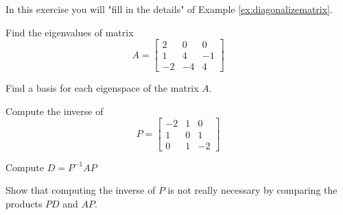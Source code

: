 \documentclass{ximera}
\author{Zack Reed}
\begin{document}
  \begin{problem}
  In this exercise you will "fill in the details" of Example \ref{ex:diagonalizematrix}.
  \begin{problem}\label{prob:ex:diagonalizematrix1}
  Find the eigenvalues of matrix
  \begin{equation*}
  A=\begin{bmatrix}
  2 & 0 & 0 \\
  1 & 4 & -1 \\
  -2 & -4 & 4
  \end{bmatrix}
  \end{equation*}
  \end{problem}
  \begin{problem}\label{prob:ex:diagonalizematrix2}
  Find a basis for each eigenspace of the matrix $A$.
  \end{problem}
  \begin{problem}\label{prob:ex:diagonalizematrix3}
  Compute the inverse of \begin{equation*}
  P=
  \begin{bmatrix}
  -2 & 1 & 0 \\
  1 & 0 & 1 \\
  0 & 1 & -2
  \end{bmatrix}
  \end{equation*}
  \end{problem}
  \begin{problem}\label{prob:ex:diagonalizematrix5}
  Compute $D=P^{-1}AP$
  \end{problem}
  \begin{problem}\label{prob:ex:diagonalizematrix4}
  Show that computing the inverse of $P$ is not really necessary by comparing the products  $PD$ and $AP$.
  \end{problem}
    \end{problem}
   
\end{document}
